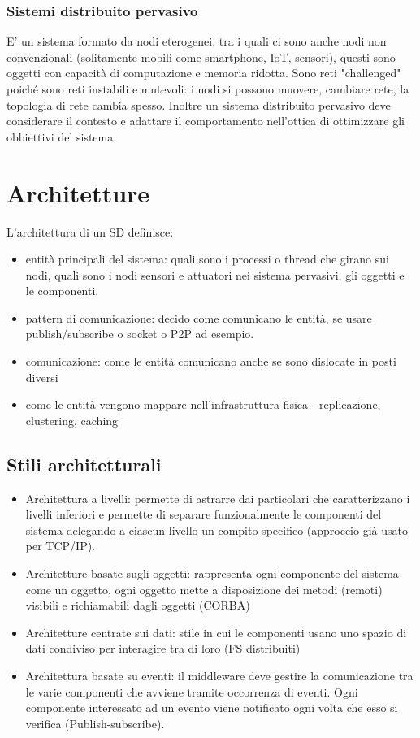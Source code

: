 \documentclass[12pt,italian]{report}
\begin{document}
\subsection{Sistemi distribuito pervasivo}
\label{sec:pervasiv}
E' un sistema formato da nodi eterogenei, tra i quali ci sono anche nodi non convenzionali (solitamente mobili come smartphone, IoT, sensori), questi sono oggetti con capacità di computazione e memoria ridotta. Sono reti "challenged" poiché sono reti instabili e mutevoli: i nodi si possono muovere, cambiare rete, la topologia di rete cambia spesso. Inoltre un sistema distribuito pervasivo deve considerare il contesto e adattare il comportamento nell'ottica di ottimizzare gli obbiettivi del sistema. 

\chapter{Architetture}
\label{cap:arch}
L'architettura di un SD definisce:
\begin{itemize}
    \item entità principali del sistema: quali sono i processi o thread che girano sui nodi, quali sono i nodi sensori e attuatori nei sistema pervasivi, gli oggetti e le componenti. 
    \item pattern di comunicazione: decido come comunicano le entità, se usare publish/subscribe o socket o P2P ad esempio.
    \item comunicazione: come le entità comunicano anche se sono dislocate in posti diversi
    \item come le entità vengono mappare nell'infrastruttura fisica - replicazione, clustering, caching 
\end{itemize}

\section{Stili architetturali}
\begin{itemize}
    \item Architettura a livelli: permette di astrarre dai particolari che caratterizzano i livelli inferiori e permette di separare funzionalmente le componenti del sistema delegando a ciascun livello un compito specifico (approccio già usato per TCP/IP). 
    \item Architetture basate sugli oggetti: rappresenta ogni componente del sistema come un oggetto, ogni oggetto mette a disposizione dei metodi (remoti) visibili e richiamabili dagli oggetti (CORBA)
    \item Architetture centrate sui dati: stile in cui le componenti usano uno spazio di dati condiviso per interagire tra di loro (FS distribuiti)
    \item Architettura basate su eventi: il middleware deve gestire la comunicazione tra le varie componenti che avviene tramite occorrenza di eventi. Ogni componente interessato ad un evento viene notificato ogni volta che esso si verifica (Publish-subscribe). 
\end{itemize}
\end{document}
